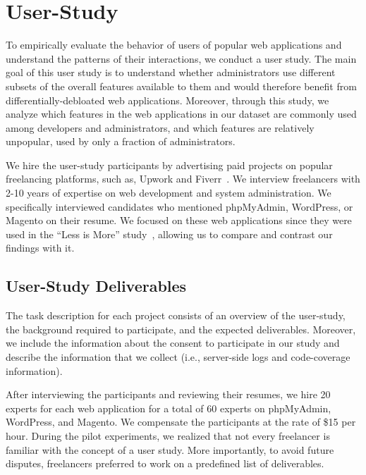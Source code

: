 \section{User-Study}
\label{sec:userstudy}

To empirically evaluate the behavior of users of popular web applications and understand the patterns of their interactions, we conduct a user study. 
The main goal of this user study is to understand whether administrators use different subsets of the overall features available to them and would therefore benefit from differentially-debloated web applications.
Moreover, through this study, we analyze which features in the web applications in our dataset are commonly used among developers and administrators, and which features are relatively unpopular, used by only a fraction of administrators. 

We hire the user-study participants by advertising paid projects on popular freelancing platforms, such as, Upwork and Fiverr~\cite{upwork, fiverr}. 
We interview freelancers with 2-10 years of expertise on web development and system administration. 
We specifically interviewed candidates who mentioned phpMyAdmin, WordPress, or Magento on their resume. 
We focused on these web applications since they were used in the ``Less is More'' study~\cite{lessismore}, allowing us to compare and contrast our findings with it. 

\subsection{User-Study Deliverables}
The task description for each project consists of an overview of the user-study, the background required to participate, and the expected deliverables. 
Moreover, we include the information about the consent to participate in our study and describe the information that we collect (i.e., server-side logs and code-coverage information). 

After interviewing the participants and reviewing their resumes, we hire 20 experts for each web application for a total of 60 experts on phpMyAdmin, WordPress, and Magento. 
We compensate the participants at the rate of \$15 per hour.
During the pilot experiments, we realized that not every freelancer is familiar with the concept of a user study. 
More importantly, to avoid future disputes, freelancers preferred to work on a predefined list of deliverables. 

